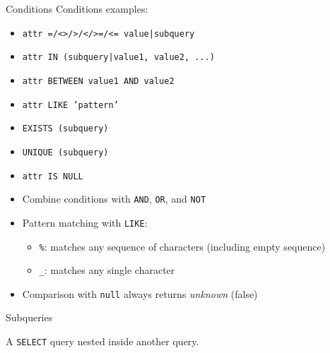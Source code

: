 \label{conditions}
\begin{theorem}
    {Conditions}
    Conditions examples:
    \begin{itemize}
        \item \texttt{attr =/<>/>/</>=/<= value|subquery}
        \item \texttt{attr IN (subquery|value1, value2, ...)}
        \item \texttt{attr BETWEEN value1 AND value2}
        \item \texttt{attr LIKE 'pattern'}
        \item \texttt{EXISTS (subquery)}
        \item \texttt{UNIQUE (subquery)}
        \item \texttt{attr IS NULL}
        \item Combine conditions with \texttt{AND}, \texttt{OR}, and \texttt{NOT}
        \item Pattern matching with \texttt{LIKE}:
              \begin{itemize}
                  \item \texttt{\%}: matches any sequence of characters (including empty sequence)
                  \item \texttt{\_}: matches any single character
              \end{itemize}
        \item Comparison with \texttt{null} always returns \textit{unknown} (false)
    \end{itemize}
\end{theorem}

\begin{theorem}
    {Subqueries}

    A \texttt{SELECT} query nested inside another query.
\end{theorem}

